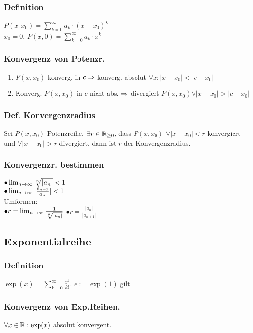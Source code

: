 \subsubsection*{Definition}
$P(x, x_0) = \sum_{k = 0}^\infty a_k \cdot (x - x_0)^k$\\
$x_0 = 0$, $P(x, 0) = \sum_{k = 0}^\infty a_k \cdot x^k$
\subsubsection*{Konvergenz von Potenzr.}
\begin{enumerate}[label=\alph*., noitemsep]
    \item $P(x, x_0)$ konverg. in $c \Rightarrow$ konverg. absolut $\forall x: |x - x_0| < |c - x_0|$
    \item Konverg. $P(x, x_0)$ in $c$ nicht abs. $\Rightarrow$ divergiert $P(x, x_0) \forall |x - x_0| > |c - x_0|$
\end{enumerate}
\subsubsection*{Def. Konvergenzradius}
Sei $P(x, x_0)$ Potenzreihe. $\exists r \in \mathbb R_{\geq 0}$, dass $P(x, x_0)$ $\forall |x- x_0| < r$ konvergiert und $\forall |x - x_0| > r$ divergiert, dann ist $r$ der Konvergenzradius.
\subsubsection*{Konvergenzr. bestimmen}
$\bullet \lim_{n \rightarrow \infty} \sqrt[n]{|a_n|} < 1$\\
$\bullet \lim_{n \rightarrow \infty} |\frac{a_{n+1}}{a_n}| < 1$\\
Umformen:\\
$\bullet r = \lim_{n \rightarrow \infty} \frac{1}{\sqrt[n]{|a_n|}}$
$\bullet r = \frac{|a_n|}{|a_{n+1}|}$
\subsection*{Exponentialreihe}
\subsubsection*{Definition}
$\exp(x) = \sum_{k = 0}^\infty \frac{x^k}{k!}$. $e := \exp(1)$ gilt
\subsubsection*{Konvergenz von Exp.Reihen.}
$\forall x \in \mathbb R: \exp(x)$ absolut konvergent.
